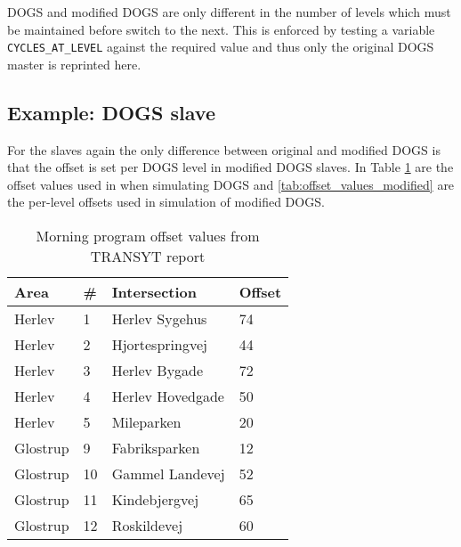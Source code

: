 DOGS and modified DOGS are only different in the number of levels which must be maintained before switch to the next. This is enforced by testing a variable \verb|CYCLES_AT_LEVEL| against the required value and thus only the original DOGS master is reprinted here.



\subsection{Example: DOGS slave}
For the slaves again the only difference between original and modified DOGS is that the offset is set per DOGS level in modified DOGS slaves. In Table \ref{tab:offset_values} are the offset values used in when simulating DOGS and \ref{tab:offset_values_modified} are the per-level offsets used in simulation of modified DOGS.

\begin{table}[ht]
\centering
\begin{tabular}{l|l|l|l}
\textbf{Area} & \textbf{\#} & \textbf{Intersection} & \textbf{Offset}\\ \hline
Herlev & 1 & Herlev Sygehus & 74\\
Herlev & 2 & Hjortespringvej & 44\\
Herlev & 3 & Herlev Bygade & 72\\
Herlev & 4 & Herlev Hovedgade & 50\\
Herlev & 5 & Mileparken & 20\\ \hline
Glostrup & 9 & Fabriksparken & 12\\
Glostrup & 10 & Gammel Landevej & 52\\
Glostrup & 11 & Kindebjergvej & 65\\
Glostrup & 12 & Roskildevej & 60\\
\end{tabular}
\caption{Morning program offset values from TRANSYT report \cite{transyt}}
\label{tab:offset_values}
\end{table}

